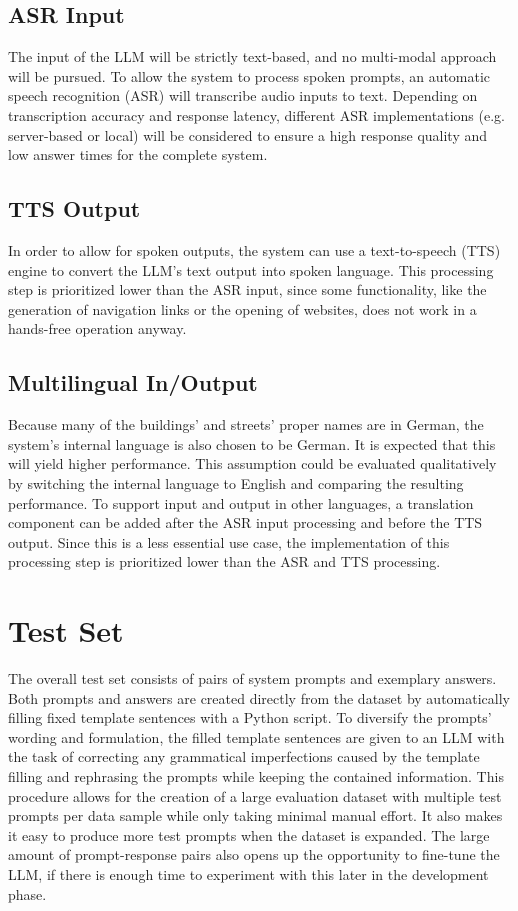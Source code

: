 \documentclass{article}
\begin{document}
\subsection{ASR Input}
The input of the LLM will be strictly text-based, and no multi-modal approach will be pursued. To allow the system to process spoken prompts, an automatic speech recognition (ASR) will transcribe audio inputs to text. Depending on transcription accuracy and response latency, different ASR implementations (e.g. server-based or local) will be considered to ensure a high response quality and low answer times for the complete system.

\subsection{TTS Output}
In order to allow for spoken outputs, the system can use a text-to-speech (TTS) engine to convert the LLM's text output into spoken language. This processing step is prioritized lower than the ASR input, since some functionality, like the generation of navigation links or the opening of websites, does not work in a hands-free operation anyway.

\subsection{Multilingual In/Output}
Because many of the buildings' and streets' proper names are in German, the system's internal language is also chosen to be German. It is expected that this will yield higher performance. This assumption could be evaluated qualitatively by switching the internal language to English and comparing the resulting performance. To support input and output in other languages, a translation component can be added after the ASR input processing and before the TTS output. Since this is a less essential use case, the implementation of this processing step is prioritized lower than the ASR and TTS processing.

\section{Test Set} \label{sec:test_set}
The overall test set consists of pairs of system prompts and exemplary answers. Both prompts and answers are created directly from the dataset by automatically filling fixed template sentences with a Python script. To diversify the prompts' wording and formulation, the filled template sentences are given to an LLM with the task of correcting any grammatical imperfections caused by the template filling and rephrasing the prompts while keeping the contained information. This procedure allows for the creation of a large evaluation dataset with multiple test prompts per data sample while only taking minimal manual effort. It also makes it easy to produce more test prompts when the dataset is expanded. The large amount of prompt-response pairs also opens up the opportunity to fine-tune the LLM, if there is enough time to experiment with this later in the development phase.\\
\end{document}
